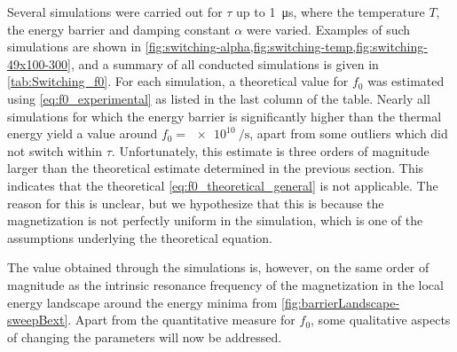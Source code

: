 \documentclass[11pt,a4paper,english]{article}
\begin{document}
Several simulations were carried out for $\tau$ up to \SI{1}{\micro\second}, where the temperature $T$, the energy barrier and damping constant $\alpha$ were varied. Examples of such simulations are shown in \cref{fig:switching-alpha,fig:switching-temp,fig:switching-49x100-300}, and a summary of all conducted simulations is given in \cref{tab:Switching_f0}. For each simulation, a theoretical value for $f_0$ was estimated using \cref{eq:f0_experimental} as listed in the last column of the table. 
Nearly all simulations for which the energy barrier is significantly higher than the thermal energy yield a value around $f_0=\SI{e10}{\per\second}$, apart from some outliers which did not switch within $\tau$. Unfortunately, this estimate is three orders of magnitude larger than the theoretical estimate determined in the previous section. This indicates that the theoretical \cref{eq:f0_theoretical_general} is not applicable. The reason for this is unclear, but we hypothesize that this is because the magnetization is not perfectly uniform in the simulation, which is one of the assumptions underlying the theoretical equation. \par
The value obtained through the simulations is, however, on the same order of magnitude as the intrinsic resonance frequency of the magnetization in the local energy landscape around the energy minima from \cref{fig:barrierLandscape-sweepBext}.
Apart from the quantitative measure for $f_0$, some qualitative aspects of changing the parameters will now be addressed.
\end{document}
